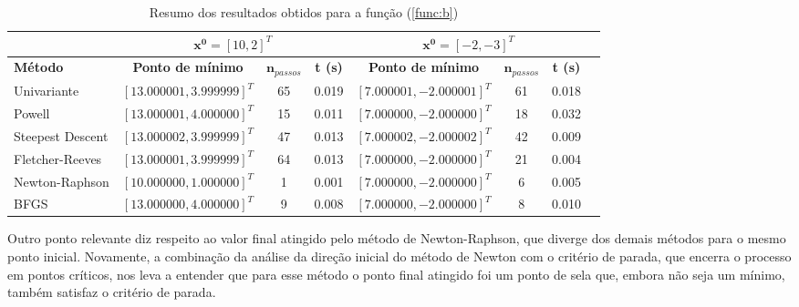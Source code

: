 \documentclass[10pt, a4paper]{article}
\begin{document}
\begin{table}[htpb]
  \centering
  \begin{tabular}{|l|c|c|c|c|c|c|c|}
    \multicolumn{1}{c}{} %
    & 
    \multicolumn{3}{c}{$\mathbf{x^0} = [10, 2]^T$} \vline
    & 
    \multicolumn{3}{c}{$\mathbf{x^0} = [-2, -3]^T$} \\%
    \hline%
    \textbf{Método}
    &
    \textbf{Ponto de mínimo}
    & 
    $\mathbf{n}_{passos}$
    & 
    \textbf{t (s)}
    &
    \textbf{Ponto de mínimo}
    & 
    $\mathbf{n}_{passos}$
    & 
    \textbf{t (s)}
    \\
    Univariante        & $[13.000001, 3.999999]^T$ & 65 & 0.019 &  $[7.000001, -2.000001]^T$ &  61  & 0.018    \\
    Powell             & $[13.000001, 4.000000]^T$ & 15 & 0.011 &  $[7.000000, -2.000000]^T$ &  18  & 0.032    \\
    Steepest Descent   & $[13.000002, 3.999999]^T$ & 47 & 0.013 &  $[7.000002, -2.000002]^T$ &  42  & 0.009    \\
    Fletcher-Reeves    & $[13.000001, 3.999999]^T$ & 64 & 0.013 &  $[7.000000, -2.000000]^T$ &  21  & 0.004    \\
    Newton-Raphson     & $[10.000000, 1.000000]^T$ & 1  & 0.001 &  $[7.000000, -2.000000]^T$ &  6   & 0.005    \\
    BFGS               & $[13.000000, 4.000000]^T$ & 9  & 0.008 &  $[7.000000, -2.000000]^T$ &  8   & 0.010    \\
    \hline
  \end{tabular}
  \caption{Resumo dos resultados obtidos para a função (\ref{func:b})}
  \label{tab:q1b_results}
\end{table}

Outro ponto relevante diz respeito ao valor final atingido pelo método de Newton-Raphson, que diverge dos demais métodos para o mesmo
ponto inicial. Novamente, a combinação da análise da direção inicial do método de Newton com o critério de parada, que encerra o processo
em pontos críticos, nos leva a entender que para esse método o ponto final atingido foi um ponto de sela que, embora não seja um mínimo,
também satisfaz o critério de parada.
\end{document}
